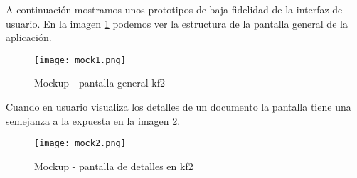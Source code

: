 A continuación mostramos unos prototipos de baja fidelidad de la interfaz de usuario. En la imagen \ref{image:mockup1} podemos ver la estructura de la pantalla general de la aplicación.\\

\begin{figure}[h!]
  \centering
     \texttt{[image: mock1.png]}
  \caption{Mockup - pantalla general \gls{kf2}}
  \label{image:mockup1}
\end{figure}

Cuando en usuario visualiza los detalles de un documento la pantalla tiene una semejanza a la expuesta en la imagen \ref{image:mockup2}.

\begin{figure}[h!]
  \centering
     \texttt{[image: mock2.png]}
  \caption{Mockup - pantalla de detalles en \gls{kf2}}
  \label{image:mockup2}
\end{figure}
